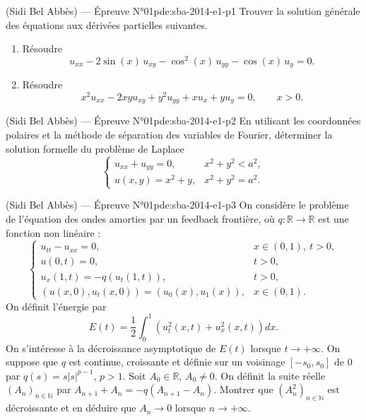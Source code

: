 \newpage
\begin{problem}{(Sidi Bel Abbès) — Épreuve N°01}{pde:sba-2014-e1-p1}
Trouver la solution générale des équations aux dérivées partielles suivantes.
\begin{enumerate}\item Résoudre
$$u_{xx}-2\sin(x)\,u_{xy}-\cos^2(x)\,u_{yy}-\cos(x)\,u_y=0.$$
\item Résoudre
$$x^2u_{xx}-2xyu_{xy}+y^2u_{yy}+xu_x+yu_y=0,\qquad x>0.$$\end{enumerate}
\end{problem}
\newpage
\begin{problem}{(Sidi Bel Abbès) — Épreuve N°01}{pde:sba-2014-e1-p2}
En utilisant les coordonnées polaires et la méthode de séparation des variables de Fourier, déterminer la solution formelle du problème de Laplace
$$\begin{cases}u_{xx}+u_{yy}=0, & x^2+y^2<a^2,\\ u(x,y)=x^2+y, & x^2+y^2=a^2.\end{cases}$$
\end{problem}
\newpage
\begin{problem}{(Sidi Bel Abbès) — Épreuve N°01}{pde:sba-2014-e1-p3}
On considère le problème de l'équation des ondes amorties par un feedback frontière, où $q:\mathbb{R}\to\mathbb{R}$ est une fonction non linéaire :
$$\begin{cases}u_{tt}-u_{xx}=0, & x\in(0,1),\ t>0,\\ u(0,t)=0, & t>0,\\ u_x(1,t)=-q(u_t(1,t)), & t>0,\\ (u(x,0),u_t(x,0))=(u_0(x),u_1(x)), & x\in(0,1).\end{cases}$$
On définit l'énergie par
$$E(t)=\frac12\int_0^1\left(u_t^2(x,t)+u_x^2(x,t)\right)dx.$$
On s'intéresse à la décroissance asymptotique de $E(t)$ lorsque $t\to+\infty$. On suppose que $q$ est continue, croissante et définie sur un voisinage $[-s_0,s_0]$ de $0$ par $q(s)=s|s|^{p-1}$, $p>1$. Soit $A_0\in\mathbb{R}$, $A_0\neq0$. On définit la suite réelle $(A_n)_{n\in\mathbb{N}}$ par $A_{n+1}+A_n=-q(A_{n+1}-A_n)$. Montrer que $(A_n^2)_{n\in\mathbb{N}}$ est décroissante et en déduire que $A_n\to0$ lorsque $n\to+\infty$.
\end{problem}
\newpage

